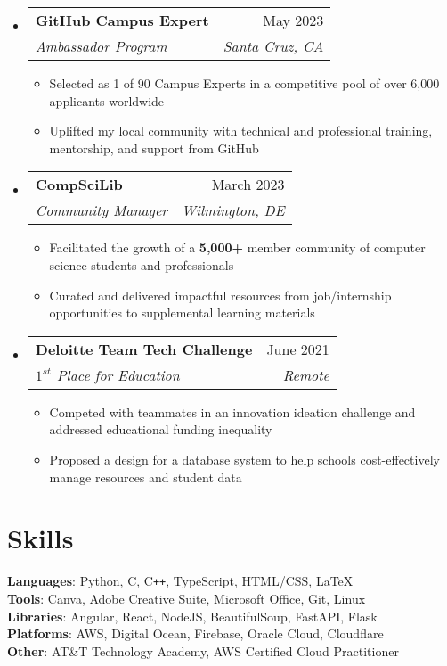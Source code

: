 \documentclass[letterpaper,11pt]{article}
\makeatletter
\newcommand{\resumeItem}[1]{
  \item\small{
    {#1 \vspace{-2pt}}
  }
}
\newcommand{\resumeSubheading}[4]{
  \vspace{-2pt}\item
    \begin{tabular*}{0.97\textwidth}[t]{l@{\extracolsep{\fill}}r}
      \textbf{#1} & #2 \\
      \textit{\small#3} & \textit{\small #4} \\
    \end{tabular*}\vspace{-7pt}
}
\newcommand{\resumeSubHeadingListStart}{\begin{itemize}[leftmargin=0.15in, label={}]}
\newcommand{\resumeSubHeadingListEnd}{\end{itemize}}
\newcommand{\resumeItemListStart}{\begin{itemize}}
\newcommand{\resumeItemListEnd}{\end{itemize}\vspace{-5pt}}
\makeatother
\begin{document}
\resumeSubHeadingListStart
\resumeSubheading{GitHub Campus Expert}{May 2023}{Ambassador Program}{Santa Cruz, CA}
\resumeItemListStart
\resumeItem{Selected as 1 of 90 Campus Experts in a competitive pool of over 6,000 applicants worldwide}
\resumeItem{Uplifted my local community with technical and professional training, mentorship, and support from GitHub}
\resumeItemListEnd

\resumeSubheading{CompSciLib}{March 2023}{Community Manager}{Wilmington, DE}
\resumeItemListStart
\resumeItem{Facilitated the growth of a \textbf{5,000+} member community of computer science students and professionals}
\resumeItem{Curated and delivered impactful resources from job/internship opportunities to supplemental learning materials}
\resumeItemListEnd

\resumeSubheading{Deloitte Team Tech Challenge}{June 2021}{$1^{st}$ Place for Education}{Remote}
\resumeItemListStart
\resumeItem{Competed with teammates in an innovation ideation challenge and addressed educational funding inequality}
\resumeItem{Proposed a design for a database system to help schools cost-effectively manage resources and student data}
\resumeItemListEnd


\resumeSubHeadingListEnd
\vspace{-10pt}

\section{Skills}
\begin{itemize}[leftmargin=0.15in, label={}]
	\small{\item{
		            \textbf{Languages}{: Python, C, C\texttt{++}, TypeScript, HTML/CSS, \LaTeX} \\
		            \textbf{Tools}{: Canva, Adobe Creative Suite, Microsoft Office, Git, Linux} \\
		            \textbf{Libraries}{: Angular, React, NodeJS, BeautifulSoup, FastAPI, Flask} \\
		            \textbf{Platforms}{: AWS, Digital Ocean, Firebase, Oracle Cloud, Cloudflare} \\
		            \textbf{Other}{: AT\&T Technology Academy, AWS Certified Cloud Practitioner} \\
		      }}
\end{itemize}
\end{document}

